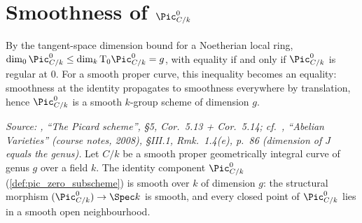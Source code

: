 \section{Smoothness of \(\Pic^0_{C/k}\)}
\label{sec:pic0_smooth}

By the tangent-space dimension bound for a Noetherian local ring,
\(\dim_0 \Pic^0_{C/k} \le \dim_k \tu T_0 \Pic^0_{C/k} = g\), with
equality if and only if \(\Pic^0_{C/k}\) is regular at \(0\). For a
smooth proper curve, this inequality becomes an equality: smoothness
at the identity propagates to smoothness everywhere by
translation, hence \(\Pic^0_{C/k}\) is a smooth \(k\)-group scheme of
dimension \(g\).

\begin{theorem}
  \label{thm:pic0_smooth}

  \textit{Source: \cite{kleiman-picard}, ``The Picard scheme'', \S 5,
  Cor.~5.13 + Cor.~5.14; cf.\ \cite{milne-av}, ``Abelian Varieties''
  (course notes, 2008), \S III.1, Rmk.~1.4(e), p.~86 (dimension of \(J\)
  equals the genus).}
  Let \(C/k\) be a smooth proper geometrically integral curve of genus
  \(g\) over a field \(k\). The identity component \(\Pic^0_{C/k}\)
  (\cref{def:pic_zero_subscheme}) is smooth over \(k\) of dimension
  \(g\): the structural morphism
  \((\Pic^0_{C/k}) \to \Spec k\) is smooth, and every closed point of
  \(\Pic^0_{C/k}\) lies in a smooth open neighbourhood.
\end{theorem}

